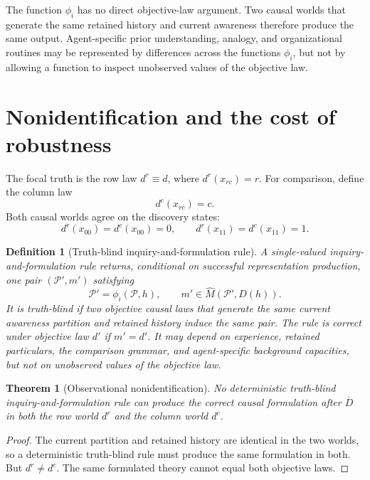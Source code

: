 \documentclass[11pt]{article}
\newtheorem{definition}[assumption]{Definition}
\newtheorem{theorem}[assumption]{Theorem}
\begin{document}
The function $\phi_i$ has no direct objective-law argument.  Two causal worlds
that generate the same retained history and current awareness therefore
produce the same output.  Agent-specific prior understanding, analogy, and
organizational routines may be represented by differences across the functions
$\phi_i$, but not by allowing a function to inspect unobserved values of the
objective law.

\section{Nonidentification and the cost of robustness}

The focal truth is the row law $d^r\equiv d$, where $d^r(x_{rc})=r$.  For comparison, define the
column law
\begin{equation}
d^c(x_{rc})=c.
\label{eq:column-law}
\end{equation}
Both causal worlds agree on the discovery states:
\[
d^r(x_{00})=d^c(x_{00})=0,
\qquad
d^r(x_{11})=d^c(x_{11})=1.
\]

\begin{definition}[Truth-blind inquiry-and-formulation rule]
A single-valued inquiry-and-formulation rule returns, conditional on successful
representation production, one pair $(\mathcal P',m')$ satisfying
\[
\mathcal P'=\phi_i(\mathcal P,h),
\qquad
m'\in\widehat M(\mathcal P',D(h)).
\]
It is truth-blind if two objective causal laws that generate the same current
awareness partition and retained history induce the same pair.  The rule is
correct under objective law $d'$ if $m'=d'$.  It may depend on experience,
retained particulars, the comparison grammar, and agent-specific background
capacities, but not on unobserved values of the objective law.
\end{definition}

\begin{theorem}[Observational nonidentification]
\label{thm:nonidentification}
No deterministic truth-blind inquiry-and-formulation rule can produce the correct causal
formulation after $\overline D$ in both the row world $d^r$ and the column world
$d^c$.
\end{theorem}

\begin{proof}
The current partition and retained history are identical in the two worlds, so
a deterministic truth-blind rule must produce the same formulation in both.
But $d^r\neq d^c$.  The same formulated theory cannot equal both objective
laws.
\end{proof}
\end{document}
